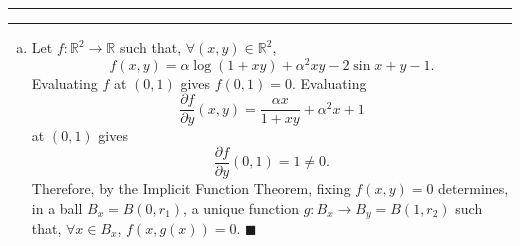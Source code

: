 \documentclass[11pt]{article}
\newcounter{questionCounter}
\newcounter{partCounter}[questionCounter]
\newenvironment{question}[2][\arabic{questionCounter}]{%
    \setcounter{partCounter}{0}%
    \vspace{.25in} \hrule \vspace{0.5em}%
        \noindent{\bf #2}%
    \vspace{0.8em} \hrule \vspace{.10in}%
    \addtocounter{questionCounter}{1}%
}{}
\begin{document}
\begin{question}{Problem 4}
\begin{enumerate}[(a)]
\item Let $f : \mathbb{R}^2 \rightarrow \mathbb{R}$ such that,
$\forall (x,y) \in \mathbb{R}^2$,
\[f(x,y) = \alpha \log(1 + xy) + \alpha^2xy - 2 \sin x + y - 1.\]
Evaluating $f$ at $(0,1)$ gives $f(0,1) = 0$.
Evaluating
\[\frac{\partial f}{\partial y} (x,y) = \frac{\alpha x}{1 + xy} + \alpha^2 x + 1\]
at $(0,1)$ gives 
\[\frac{\partial f}{\partial y} (0,1) = 1 \neq 0.\] Therefore, by the Implicit
Function Theorem, fixing $f(x,y) = 0$ determines, in a ball $B_x = B(0,r_1)$,
a unique function $g: B_x \rightarrow B_y = B(1,r_2)$ such that,
$\forall x \in B_x$, $f(x,g(x)) = 0$. \qquad $\blacksquare$
\end{enumerate}
\end{question}
\end{document}
